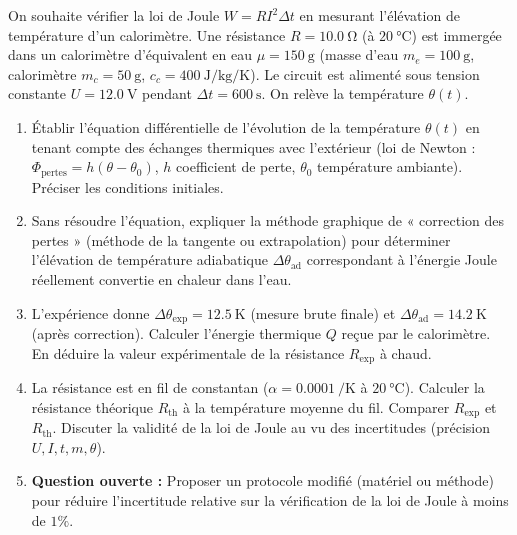 \documentclass[11pt]{article}
\begin{document}
\begin{exercice}
On souhaite vérifier la loi de Joule $W = R I^2 \Delta t$ en mesurant l'élévation de température d'un calorimètre. Une résistance $R = \SI{10,0}{\ohm}$ (à $\SI{20}{\celsius}$) est immergée dans un calorimètre d'équivalent en eau $\mu = \SI{150}{\gram}$ (masse d'eau $m_e = \SI{100}{\gram}$, calorimètre $m_c = \SI{50}{\gram}$, $c_c = \SI{400}{\joule\per\kilogram\per\kelvin}$). Le circuit est alimenté sous tension constante $U = \SI{12,0}{\volt}$ pendant $\Delta t = \SI{600}{\second}$. On relève la température $\theta(t)$.
\begin{enumerate}
    \item Établir l'équation différentielle de l'évolution de la température $\theta(t)$ en tenant compte des échanges thermiques avec l'extérieur (loi de Newton : $\Phi_{\text{pertes}} = h(\theta - \theta_0)$, $h$ coefficient de perte, $\theta_0$ température ambiante). Préciser les conditions initiales.
    \item Sans résoudre l'équation, expliquer la méthode graphique de « correction des pertes » (méthode de la tangente ou extrapolation) pour déterminer l'élévation de température adiabatique $\Delta \theta_{\text{ad}}$ correspondant à l'énergie Joule réellement convertie en chaleur dans l'eau.
    \item L'expérience donne $\Delta \theta_{\text{exp}} = \SI{12,5}{\kelvin}$ (mesure brute finale) et $\Delta \theta_{\text{ad}} = \SI{14,2}{\kelvin}$ (après correction). Calculer l'énergie thermique $Q$ reçue par le calorimètre. En déduire la valeur expérimentale de la résistance $R_{\text{exp}}$ à chaud.
    \item La résistance est en fil de constantan ($\alpha = \SI{0,0001}{\per\kelvin}$ à $\SI{20}{\celsius}$). Calculer la résistance théorique $R_{\text{th}}$ à la température moyenne du fil. Comparer $R_{\text{exp}}$ et $R_{\text{th}}$. Discuter la validité de la loi de Joule au vu des incertitudes (précision $U, I, t, m, \theta$).
    \item \textbf{Question ouverte :} Proposer un protocole modifié (matériel ou méthode) pour réduire l'incertitude relative sur la vérification de la loi de Joule à moins de $1\%$.
\end{enumerate}
\end{exercice}
\end{document}
